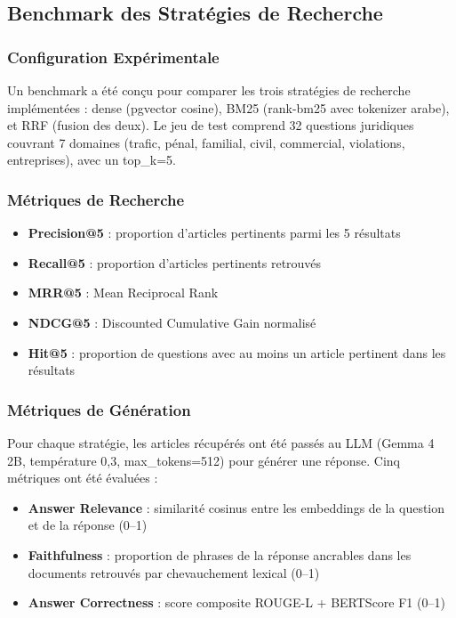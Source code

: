 \subsection{Benchmark des Stratégies de Recherche}

\subsubsection{Configuration Expérimentale}

Un benchmark a été conçu pour comparer les trois stratégies de recherche
implémentées : dense (pgvector cosine), BM25 (rank-bm25 avec tokenizer
arabe), et RRF (fusion des deux). Le jeu de test comprend 32 questions
juridiques couvrant 7 domaines (trafic, pénal, familial, civil, commercial,
violations, entreprises), avec un top\_k=5.

\subsubsection{Métriques de Recherche}

\begin{itemize}
    \item \textbf{Precision@5} : proportion d'articles pertinents parmi
    les 5 résultats
    \item \textbf{Recall@5} : proportion d'articles pertinents retrouvés
    \item \textbf{MRR@5} : Mean Reciprocal Rank
    \item \textbf{NDCG@5} : Discounted Cumulative Gain normalisé
    \item \textbf{Hit@5} : proportion de questions avec au moins un
    article pertinent dans les résultats
\end{itemize}

\subsubsection{Métriques de Génération}

Pour chaque stratégie, les articles récupérés ont été passés au LLM (Gemma 4
2B, température 0,3, max\_tokens=512) pour générer une réponse. Cinq métriques
ont été évaluées :

\begin{itemize}
    \item \textbf{Answer Relevance} : similarité cosinus entre les embeddings
    de la question et de la réponse (0--1)
    \item \textbf{Faithfulness} : proportion de phrases de la réponse
    ancrables dans les documents retrouvés par chevauchement lexical (0--1)
    \item \textbf{Answer Correctness} : score composite ROUGE-L + BERTScore
    F1 (0--1)
\end{itemize}

